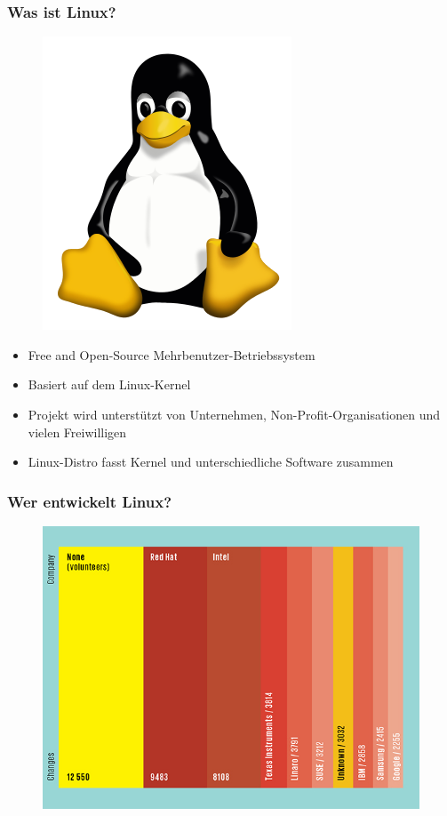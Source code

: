 \begin{frame}
\frametitle{Was ist Linux?}
\begin{figure}
\includegraphics[scale=0.17]{resources/tux.png}
\end{figure}
\begin{itemize}
	\item Free and Open-Source Mehrbenutzer-Betriebssystem
	\item Basiert auf dem Linux-Kernel
	\item Projekt wird unterstützt von Unternehmen, Non-Profit-Organisationen und vielen Freiwilligen
	\item Linux-Distro fasst Kernel und unterschiedliche Software zusammen
\end{itemize}
\end{frame}

\begin{frame}
\frametitle{Wer entwickelt Linux?}
\begin{figure}
\includegraphics[scale=0.4]{resources/linuxdev.jpg}
\end{figure}
\end{frame}

